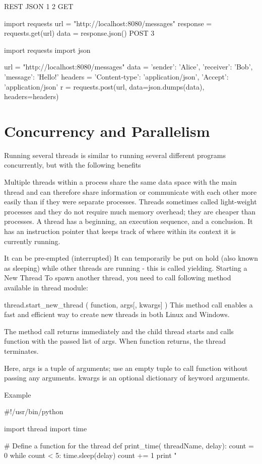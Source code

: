 REST
JSON 1 2
GET

import requests
url = "http://localhost:8080/messages"
response = requests.get(url)
data = response.json()
POST 3

import requests
import json

url = "http://localhost:8080/messages"
data = {'sender': 'Alice', 'receiver': 'Bob', 'message': 'Hello!'}
headers = {
  'Content-type': 'application/json',
  'Accept': 'application/json'}
r = requests.post(url, data=json.dumps(data), headers=headers)

\section{Concurrency and Parallelism}

Running several threads is similar to running several different programs concurrently, but with the following benefits

Multiple threads within a process share the same data space with the main thread and can therefore share information or communicate with each other more easily than if they were separate processes.
Threads sometimes called light-weight processes and they do not require much memory overhead; they are cheaper than processes.
A thread has a beginning, an execution sequence, and a conclusion. It has an instruction pointer that keeps track of where within its context it is currently running.

It can be pre-empted (interrupted)
It can temporarily be put on hold (also known as sleeping) while other threads are running - this is called yielding.
Starting a New Thread
To spawn another thread, you need to call following method available in thread module:

thread.start_new_thread ( function, args[, kwargs] )
This method call enables a fast and efficient way to create new threads in both Linux and Windows.

The method call returns immediately and the child thread starts and calls function with the passed list of args. When function returns, the thread terminates.

Here, args is a tuple of arguments; use an empty tuple to call function without passing any arguments. kwargs is an optional dictionary of keyword arguments.

Example

#!/usr/bin/python

import thread
import time

# Define a function for the thread
def print_time( threadName, delay):
   count = 0
   while count < 5:
      time.sleep(delay)
      count += 1
      print "%

